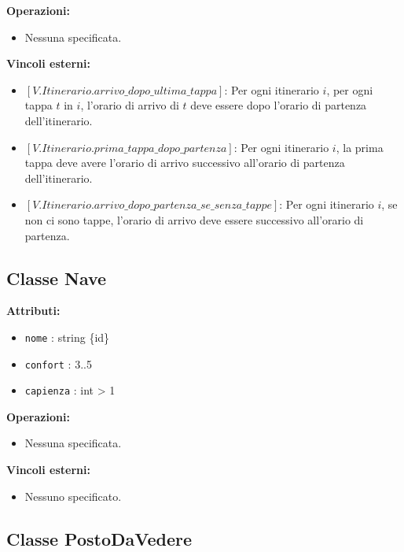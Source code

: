 \documentclass[a4paper]{scrartcl}
\begin{document}
\textbf{Operazioni:}
\begin{itemize}
    \item Nessuna specificata.
\end{itemize}

\textbf{Vincoli esterni:}
\begin{itemize}
    \item $[V.Itinerario.arrivo\_dopo\_ultima\_tappa]$: Per ogni itinerario $i$, per ogni tappa $t$ in $i$, l'orario di arrivo di $t$ deve essere dopo l'orario di partenza dell'itinerario.
    \item $[V.Itinerario.prima\_tappa\_dopo\_partenza]$: Per ogni itinerario $i$, la prima tappa deve avere l'orario di arrivo successivo all'orario di partenza dell'itinerario.
    \item $[V.Itinerario.arrivo\_dopo\_partenza\_se\_senza\_tappe]$: Per ogni itinerario $i$, se non ci sono tappe, l'orario di arrivo deve essere successivo all'orario di partenza.
\end{itemize}

\subsection{Classe Nave}

\textbf{Attributi:}
\begin{itemize}
    \item \texttt{nome} : string \{id\}
    \item \texttt{confort} : 3..5
    \item \texttt{capienza} : int > 1
\end{itemize}

\textbf{Operazioni:}
\begin{itemize}
    \item Nessuna specificata.
\end{itemize}

\textbf{Vincoli esterni:}
\begin{itemize}
    \item Nessuno specificato.
\end{itemize}

\subsection{Classe PostoDaVedere}
\end{document}
